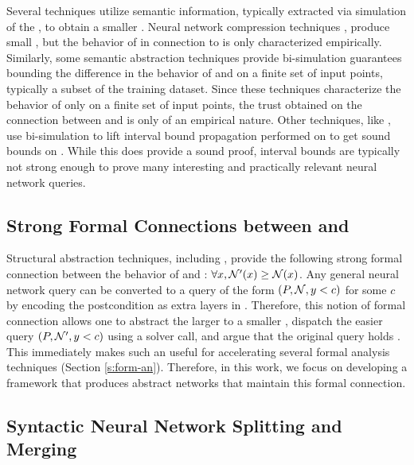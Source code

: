 Several techniques utilize semantic information, typically extracted via
simulation of the \dnn, to obtain a smaller \abs. 
Neural network compression techniques \cite{dnn-compression}, produce small
\abs, but the
behavior of \abs in connection to \cnc is only characterized empirically.
Similarly, some semantic abstraction techniques \cite{lin-comb-abs-jan} provide
bi-simulation guarantees bounding the difference in the behavior of \abs and
\cnc on a finite set of input points, typically a subset of the training
dataset. Since these techniques characterize the behavior of \abs only on a
finite set of
input points, the trust obtained on the connection between \cnc and \abs is only
of an empirical nature.
Other techniques, like \cite{deep-abstract}, use bi-simulation to lift
interval bound propagation performed on \abs to get sound bounds on \cnc. While
this does provide a sound proof, interval bounds are typically not strong enough
to prove many interesting and practically relevant neural network queries.

\subsection{Strong Formal Connections between \cnc and \abs}
\label{s:conc-abs}

Structural abstraction techniques, including \cite{cegar-nn}, provide the
following strong formal connection between the behavior of \cnc and \abs:
$\forall x, \mathcal{N'}(x) \geq \mathcal{N}(x)$. 
Any general neural network query can be converted to a query of
the form \linebreak $(P, \mathcal{N}, y < c)$ for some $c$
by encoding the postcondition as extra layers in \cnc 
\cite{cegar-nn,reluplex,lipschitz-reach}.
Therefore, this notion of formal connection allows one to abstract the larger
\cnc to a smaller \abs, dispatch the
easier query $(P, \mathcal{N'}, y < c)$ using a solver call, and argue that the
original query holds \cite{cegar-nn,cegarette,cleverest-nn}. 
This immediately makes such an \abs useful
for accelerating several formal analysis techniques (Section \ref{s:form-an}).
Therefore, in this work, we focus on developing a framework that produces
abstract networks that maintain this formal connection.

\subsection{Syntactic Neural Network Splitting and Merging}
\label{s:nn-sam}

